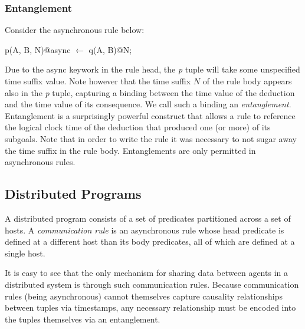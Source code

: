 \subsubsection{Entanglement}

Consider the asynchronous rule below:

\begin{Dedalus}
p(A, B, N)@async \(\leftarrow\)
  q(A, B)@N;
\end{Dedalus}

Due to the async keywork in the rule head, the \emph{p} tuple will take some unspecified time suffix value.
Note however that the time suffix $N$ of the rule body appears also in the \emph{p} tuple, capturing a 
binding between the time value of the deduction and the time value of its consequence.  We call such a binding
an \emph{entanglement}.   Entanglement is a surprisingly powerful construct that allows a rule to 
reference the logical clock time of the deduction that produced one (or more) of its subgoals.  Note that in order
to write the rule it was necessary to not sugar away the time suffix in the rule body.  Entanglements are only 
permitted in asynchronous rules.


\subsection{Distributed Programs}
A distributed \lang program consists of a set of predicates partitioned across a set of hosts.
A \emph{communication rule} is an asynchronous rule whose head predicate is defined at a different host than its body predicates,
all of which are defined at a single host.  

It is easy to see that the only mechanism for sharing data between agents in a distributed system is through such communication 
rules.  Because communication rules (being asynchronous) cannot themselves capture causality relationships between tuples
via timestamps, any necessary relationship must be encoded into the tuples themselves via an entanglement.



